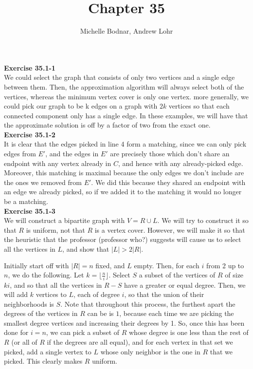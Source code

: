 \documentclass{article}
\title{Chapter 35}
\author{Michelle Bodnar, Andrew Lohr}
\begin{document}
\maketitle

\noindent\textbf{Exercise 35.1-1}\\

We could select the graph that consists of only two vertices and a single edge between them. Then, the approximation algorithm will always select both of the vertices, whereas the minimum vertex cover is only one vertex. more generally, we could pick our graph to be k edges on a graph with $2k$ vertices so that each connected component only has a single edge. In these examples, we will have that the approximate solution is off by a factor of two from the exact one.\\

\noindent\textbf{Exercise 35.1-2}\\

It is clear that the edges picked in line 4 form a matching, since we can only pick edges from $E'$, and the edges in $E'$ are precisely those which don't share an endpoint with any vertex already in $C$, and hence with any already-picked edge.  Moreover, this matching is maximal because the only edges we don't include are the ones we removed from $E'$.  We did this because they shared an endpoint with an edge we already picked, so if we added it to the matching it would no longer be a matching. \\

\noindent\textbf{Exercise 35.1-3}\\

We will construct a bipartite graph with $V = R \cup L$. We will try to construct it so that $R$ is uniform, not that $R$ is a vertex cover. However, we will make it so that the heuristic that the professor (professor who?) suggests will cause us to select all the vertices in $L$, and show that $|L| > 2|R|$.

Initially start off with $|R|=n$ fixed, and $L$ empty. Then, for each $i$ from 2 up to $n$, we do the following. Let $k = \lfloor \frac{n}{i}\rfloor$. Select $S$ a subset of the vertices of $R$ of size $ki$, and so that all the vertices in $R-S$ have a greater or equal degree. Then, we will add $k$ vertices to $L$, each of degree $i$, so that the union of their neighborhoods is $S$. Note that throughout this process, the furthest apart the degrees of the vertices in $R$ can be is $1$, because each time we are picking the smallest degree vertices and increasing their degrees by 1. So, once this has been done for $i=n$, we can pick a subset of $R$ whose degree is one less than the rest of $R$ (or all of $R$ if the degrees are all equal), and for each vertex in that set we picked, add a single vertex to $L$ whose only neighbor is the one in $R$ that we picked. This clearly makes $R$ uniform.
\end{document}
